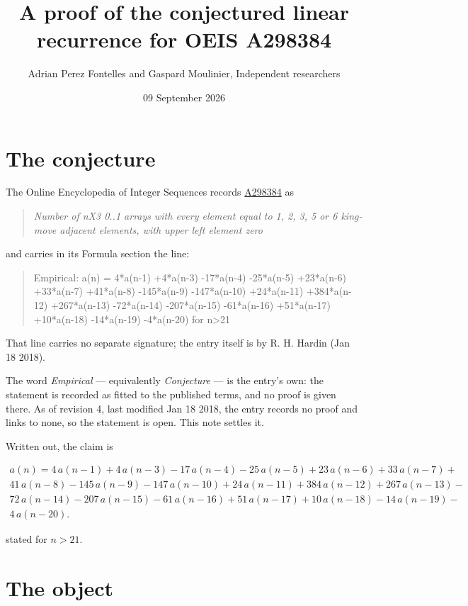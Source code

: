 \documentclass[11pt]{article}
\title{A proof of the conjectured linear recurrence for OEIS A298384}
\author{Adrian Perez Fontelles and Gaspard Moulinier, Independent researchers}
\date{09 September 2026}
\theoremstyle{definition}
\begin{document}
\maketitle
\section{The conjecture}

The Online Encyclopedia of Integer Sequences records \href{https://oeis.org/A298384}{A298384} as

\begin{quote}\itshape Number of nX3 0..1 arrays with every element equal to 1, 2, 3, 5 or 6 king-move adjacent elements, with upper left element zero\end{quote}

and carries in its Formula section the line:

\begin{quote}\ttfamily Empirical: a(n) = 4*a(n-1) +4*a(n-3) -17*a(n-4) -25*a(n-5) +23*a(n-6) +33*a(n-7) +41*a(n-8) -145*a(n-9) -147*a(n-10) +24*a(n-11) +384*a(n-12) +267*a(n-13) -72*a(n-14) -207*a(n-15) -61*a(n-16) +51*a(n-17) +10*a(n-18) -14*a(n-19) -4*a(n-20) for n>21\end{quote}

That line carries no separate signature; the entry itself is by R. H. Hardin (Jan 18 2018).

The word {\itshape Empirical} --- equivalently {\itshape Conjecture} --- is the entry's own: the statement is recorded as fitted to the published terms, and no proof is given there. As of revision 4, last modified Jan 18 2018, the entry records no proof and links to none, so the statement is open. This note settles it.

Written out, the claim is

\begin{multline*} a(n) = 4\,a(n-1) + 4\,a(n-3) - 17\,a(n-4) - 25\,a(n-5) + 23\,a(n-6) + 33\,a(n-7) + \\ 41\,a(n-8) - 145\,a(n-9) - 147\,a(n-10) + 24\,a(n-11) + 384\,a(n-12) + 267\,a(n-13) - \\ 72\,a(n-14) - 207\,a(n-15) - 61\,a(n-16) + 51\,a(n-17) + 10\,a(n-18) - 14\,a(n-19) - \\ 4\,a(n-20). \end{multline*}

stated for $n > 21$.

\section{The object}
\end{document}
